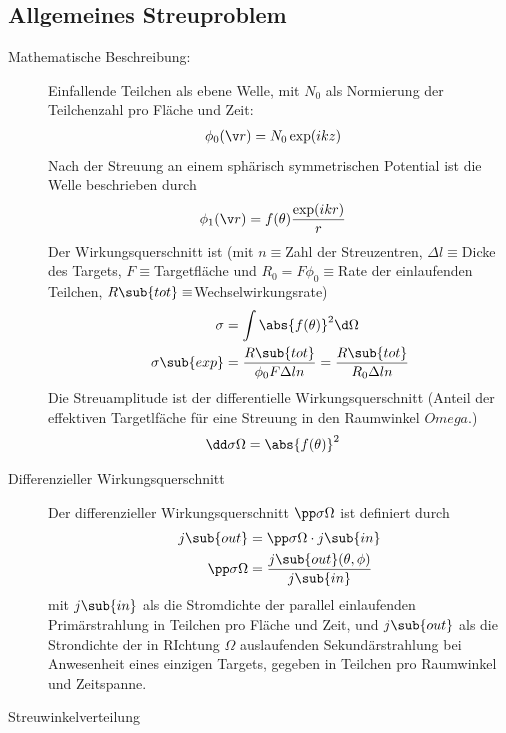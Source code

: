 \documentclass[twocolumn]{summery_4.1}
\begin{document}
\subsection{Allgemeines Streuproblem}
\begin{description}
    \item[Mathematische Beschreibung:]
    Einfallende Teilchen als ebene Welle, mit \(N_0\) als Normierung der Teilchenzahl pro Fläche und Zeit:
    \begin{align*}
        \phi_0(\v r) &= N_0 \exp(ikz) 
    \end{align*} 
    Nach der Streuung an einem sphärisch symmetrischen Potential ist die Welle beschrieben durch 
    \begin{align*}
        \phi_1(\v r) &= f(\theta)\frac{\exp(ikr)}{r}
    \end{align*}
    Der Wirkungsquerschnitt ist (mit \(n\equiv \)Zahl der Streuzentren, \(\Delta l\equiv\)Dicke des Targets, \(F\equiv\)Targetfläche und \(R_0=F\phi_0\equiv\)Rate der einlaufenden Teilchen, \(R\sub{tot}\equiv\)Wechselwirkungsrate)
    \begin{align*}
        \sigma &= \int \abs{f(\theta)}^2\d\Omega\\
        \sigma\sub{exp} &= \frac{R\sub{tot}}{\phi_0 F \Delta l n } = \frac{R\sub{tot}}{R_0 \Delta l n }
    \end{align*}
    Die Streuamplitude ist der differentielle Wirkungsquerschnitt (Anteil der effektiven Targetlfäche für eine Streuung
    in den Raumwinkel \(Omega\).)
    \begin{align*}
        \dd \sigma \Omega &= \abs{f(\theta)}^2
    \end{align*}

    \item[Differenzieller Wirkungsquerschnitt]
    Der differenzieller Wirkungsquerschnitt \(\pp \sigma \Omega\) ist definiert durch
    \begin{align*}
        j\sub{out} &= \pp \sigma \Omega  \cdot j\sub{in}\\
        \pp \sigma \Omega &=\frac{j\sub{out}(\theta,\phi)}{j\sub{in}}
    \end{align*} mit \(j\sub{in}\) als die Stromdichte der parallel einlaufenden Primärstrahlung in Teilchen pro Fläche und Zeit, und \(j\sub{out}\) als die Strondichte der in RIchtung \(\Omega\) auslaufenden Sekundärstrahlung bei Anwesenheit eines einzigen Targets, gegeben in Teilchen pro Raumwinkel und Zeitspanne.

    \item[Streuwinkelverteilung]\,
    

\end{description}
\end{document}
